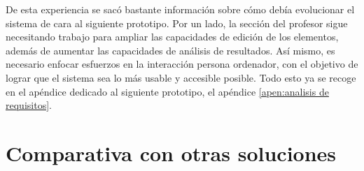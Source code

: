 De esta experiencia se sacó bastante información sobre cómo debía evolucionar el sistema de cara al siguiente prototipo. Por un lado, la sección del profesor sigue necesitando trabajo para ampliar las capacidades de edición de los elementos, además de aumentar las capacidades de análisis de resultados. Así mismo, es necesario enfocar esfuerzos en la interacción persona ordenador, con el objetivo de lograr que el sistema sea lo más usable y accesible posible. Todo esto ya se recoge en el apéndice dedicado al siguiente prototipo, el apéndice \ref{apen:analisis de requisitos}.


\section{Comparativa con otras soluciones}